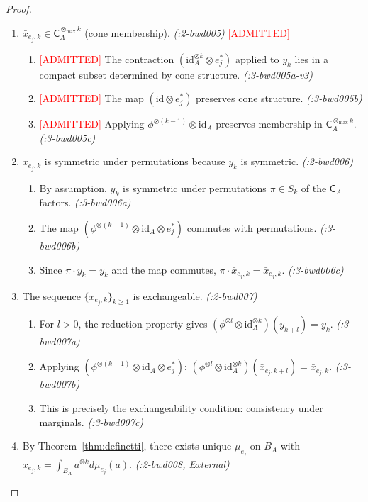 \documentclass[11pt,a4paper]{article}
\theoremstyle{definition}
\theoremstyle{plain}
\newcommand{\proofstep}[2]{\item[$\langle #1 \rangle$#2.]}
\newcommand{\tmax}{{\otimes_{\max}}}
\newcommand{\C}{\mathsf{C}}
\begin{document}
\begin{proof}
\begin{enumerate}[leftmargin=2em]
\proofstep{1}{5} $\bar{x}_{e_j,k} \in \C_A^{\tmax k}$ (cone membership). \textit{(:2-bwd005)} \textcolor{red}{[ADMITTED]}
\begin{enumerate}[leftmargin=1.5em, label=$\langle 2.\alph* \rangle$]
\item \textcolor{red}{[ADMITTED]} The contraction $({\mathrm{id}_A^{\otimes k} \otimes e_j^*})$ applied to $y_k$ lies in a compact subset determined by cone structure. \textit{(:3-bwd005a-v3)}
\item \textcolor{red}{[ADMITTED]} The map $(\mathrm{id} \otimes e_j^*)$ preserves cone structure. \textit{(:3-bwd005b)}
\item \textcolor{red}{[ADMITTED]} Applying $\phi^{\otimes(k-1)} \otimes \mathrm{id}_A$ preserves membership in $\C_A^{\tmax k}$. \textit{(:3-bwd005c)}
\end{enumerate}

\proofstep{1}{6} $\bar{x}_{e_j,k}$ is symmetric under permutations because $y_k$ is symmetric. \textit{(:2-bwd006)}
\begin{enumerate}[leftmargin=1.5em, label=$\langle 2.\alph* \rangle$]
\item By assumption, $y_k$ is symmetric under permutations $\pi \in S_k$ of the $\C_A$ factors. \textit{(:3-bwd006a)}
\item The map $(\phi^{\otimes(k-1)} \otimes \mathrm{id}_A \otimes e_j^*)$ commutes with permutations. \textit{(:3-bwd006b)}
\item Since $\pi \cdot y_k = y_k$ and the map commutes, $\pi \cdot \bar{x}_{e_j,k} = \bar{x}_{e_j,k}$. \textit{(:3-bwd006c)}
\end{enumerate}

\proofstep{1}{7} The sequence $\{\bar{x}_{e_j,k}\}_{k \geq 1}$ is exchangeable. \textit{(:2-bwd007)}
\begin{enumerate}[leftmargin=1.5em, label=$\langle 2.\alph* \rangle$]
\item For $l > 0$, the reduction property gives $(\phi^{\otimes l} \otimes \mathrm{id}_A^{\otimes k})(y_{k+l}) = y_k$. \textit{(:3-bwd007a)}
\item Applying $({\phi^{\otimes(k-1)} \otimes \mathrm{id}_A \otimes e_j^*})$: $(\phi^{\otimes l} \otimes \mathrm{id}_A^{\otimes k})(\bar{x}_{e_j,k+l}) = \bar{x}_{e_j,k}$. \textit{(:3-bwd007b)}
\item This is precisely the exchangeability condition: consistency under marginals. \textit{(:3-bwd007c)}
\end{enumerate}

\proofstep{1}{8} By Theorem~\ref{thm:definetti}, there exists unique $\mu_{e_j}$ on $B_A$ with $\bar{x}_{e_j,k} = \int_{B_A} a^{\otimes k} d\mu_{e_j}(a)$. \textit{(:2-bwd008, External)}


\end{enumerate}
\end{proof}
\end{document}
